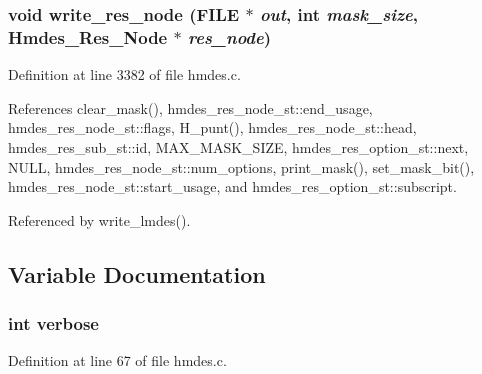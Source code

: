 \subsubsection{\setlength{\rightskip}{0pt plus 5cm}void write\_\-res\_\-node (FILE $\ast$ {\em out}, int {\em mask\_\-size}, \bf{Hmdes\_\-Res\_\-Node} $\ast$ {\em res\_\-node})}\label{hmdes_8h_e58754ae0492339071171cc7f265095f}




Definition at line 3382 of file hmdes.c.

References clear\_\-mask(), hmdes\_\-res\_\-node\_\-st::end\_\-usage, hmdes\_\-res\_\-node\_\-st::flags, H\_\-punt(), hmdes\_\-res\_\-node\_\-st::head, hmdes\_\-res\_\-sub\_\-st::id, MAX\_\-MASK\_\-SIZE, hmdes\_\-res\_\-option\_\-st::next, NULL, hmdes\_\-res\_\-node\_\-st::num\_\-options, print\_\-mask(), set\_\-mask\_\-bit(), hmdes\_\-res\_\-node\_\-st::start\_\-usage, and hmdes\_\-res\_\-option\_\-st::subscript.

Referenced by write\_\-lmdes().

\subsection{Variable Documentation}
\subsubsection{\setlength{\rightskip}{0pt plus 5cm}int \bf{verbose}}\label{hmdes_8h_0b2caeb4b6f130be43e5a2f0267dd453}




Definition at line 67 of file hmdes.c.